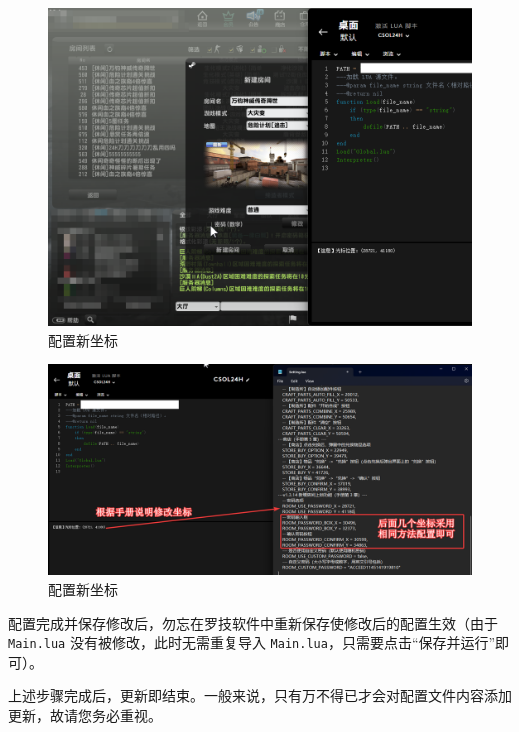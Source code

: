 \begin{figure}[H]
    \Centering
    \includegraphics[width=\textwidth]{docs/assets/update/config_new_positions_01.png}
    \caption{配置新坐标}
\end{figure}

\begin{figure}[H]
    \Centering
    \includegraphics[width=\textwidth]{docs/assets/update/config_new_positions_02.png}
    \caption{配置新坐标}
\end{figure}

配置完成并保存修改后，勿忘在罗技软件中重新保存使修改后的配置生效（由于 \lstinline{Main.lua} 没有被修改，此时无需重复导入 \lstinline{Main.lua}，只需要点击“保存并运行”即可）。

上述步骤完成后，更新即结束。一般来说，只有万不得已才会对配置文件内容添加更新，故请您务必重视。
